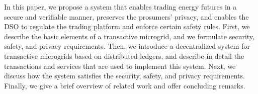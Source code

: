 In this paper, we propose a system that enables trading energy futures in a secure and verifiable manner, preserves the prosumers' privacy, and enables the DSO to regulate the trading platform and enforce certain safety rules.
First, we describe the basic elements of a transactive microgrid, and we formulate security, safety, and privacy requirements. 
Then, we introduce a decentralized system for transactive microgrids based on distributed ledgers, and describe in detail the transactions and services that are used to implement this system.
Next, we discuss how the system satisfies the security, safety, and privacy requirements.
Finally, we give a brief overview of related work and offer concluding remarks.

